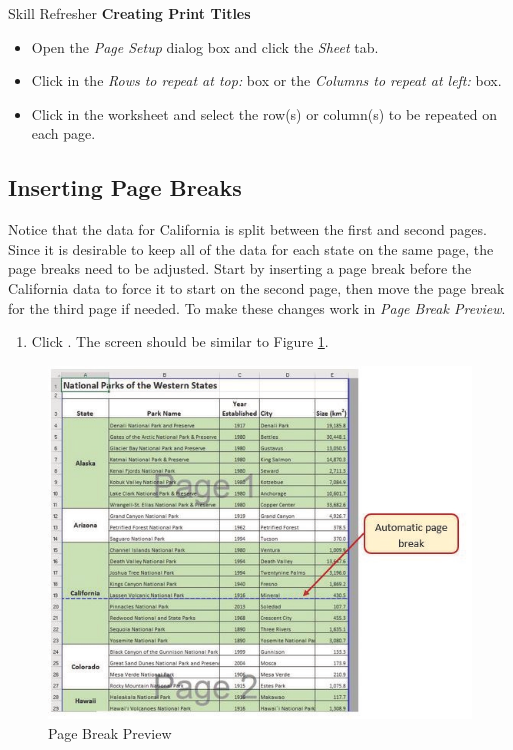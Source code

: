 \begin{center}
	\begin{sklbox}{Skill Refresher}
		\textbf{Creating Print Titles}
		\\
		\begin{itemize}
			\setlength{\itemsep}{0pt}
			\setlength{\parskip}{0pt}
			\setlength{\parsep}{0pt}

			\item Open the \textit{Page Setup} dialog box and click the \textit{Sheet} tab.
			\item Click in the \textit{Rows to repeat at top:} box or the \textit{Columns to repeat at left:} box.
			\item Click in the worksheet and select the row(s) or column(s) to be repeated on each page.
						
		\end{itemize}
	\end{sklbox}
\end{center}

\subsection{Inserting Page Breaks}

Notice that the data for California is split between the first and second pages. Since it is desirable to keep all of the data for each state on the same page, the page breaks need to be adjusted. Start by inserting a page break before the California data to force it to start on the second page, then move the page break for the third page if needed. To make these changes work in \textit{Page Break Preview}.

\begin{enumerate}
	\item Click . The screen should be similar to Figure \ref{03:fig30}.
\end{enumerate}

\begin{figure}[H]
	\centering
	\includegraphics[width=\maxwidth{.95\linewidth}]{gfx/ch03_fig30}
	\caption{Page Break Preview}
	\label{03:fig30}
\end{figure}


